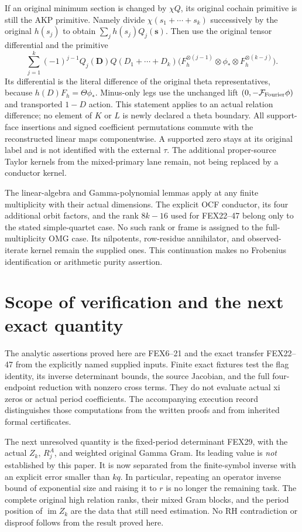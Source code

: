 \documentclass[11pt,a4paper]{article}
\begin{document}
If an original minimum section is changed by $\chi Q$, its original
cochain primitive is still the AKP primitive. Namely divide
$\chi(s_1+\cdots+s_k)$ successively by the original $h(s_j)$ to obtain
$\sum_jh(s_j)Q_j(\mathbf s)$. Then use the original tensor differential
and the primitive
\[
 \sum_{j=1}^k(-1)^{j-1}Q_j(\mathbf D)Q(D_1+\cdots+D_k)
 \bigl(F_h^{\otimes(j-1)}\otimes\phi_*\otimes
                     F_h^{\otimes(k-j)}\bigr).
 \tag{FEX50}
\]
Its differential is the literal difference of the original theta
representatives, because $h(D)F_h=\Theta\phi_*$. Minus-only legs use the
unchanged lift $(0,-\mathcal F_{\rm Fourier}\phi)$ and transported
$1-D$ action. This statement applies to an actual relation difference;
no element of $K$ or $L$ is newly declared a theta boundary.
All support-face insertions and signed coefficient permutations commute
with the reconstructed linear maps componentwise. A supported zero
stays at its original label and is not identified with the external
$\tau$. The additional proper-source Taylor kernels from the mixed-primary
lane remain, not being replaced by a conductor kernel.

The linear-algebra and Gamma-polynomial lemmas apply at any finite
multiplicity with their actual dimensions. The explicit OCF conductor,
its four additional orbit factors, and the rank $8k-16$ used for
FEX22--47 belong only to the stated simple-quartet case. No such rank or
frame is assigned to the full-multiplicity OMG case. Its nilpotents,
row-residue annihilator, and observed-iterate kernel remain the supplied
ones. This continuation makes no Frobenius identification or arithmetic
purity assertion.

\section{Scope of verification and the next exact quantity}
\label{sec:FEX-status}
The analytic assertions proved here are FEX6--21 and the exact transfer
FEX22--47 from the explicitly named supplied inputs. Finite exact
fixtures test the flag identity, its inverse determinant bounds, the
source Jacobian, and the full four-endpoint reduction with nonzero cross
terms. They do not evaluate actual xi zeros or actual period coefficients.
The accompanying execution record distinguishes those computations
from the written proofs and from inherited formal certificates.

The next unresolved quantity is the fixed-period determinant FEX29,
with the actual $Z_k$, $R_j^A$, and weighted original Gamma Gram. Its
leading value is \emph{not} established by this paper. It is now separated
from the finite-symbol inverse with an explicit error smaller than $kq$.
In particular, repeating an operator inverse bound of exponential size
and raising it to $r$ is no longer the remaining task. The complete
original high relation ranks, their mixed Gram blocks, and the period
position of $\operatorname{im}Z_k$ are the data that still need estimation.
No RH contradiction or disproof follows from the result proved here.
\end{document}

